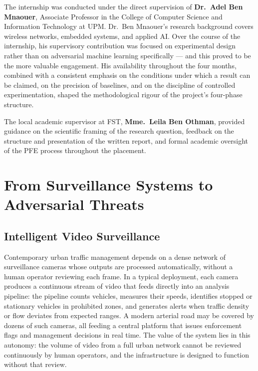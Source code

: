 \documentclass[12pt,a4paper]{report}
\begin{document}
The internship was conducted under the direct supervision of
\textbf{Dr.~Adel Ben Mnaouer}, Associate Professor in the
College of Computer Science and Information Technology at UPM.
Dr.~Ben Mnaouer's research background covers wireless networks,
embedded systems, and applied AI. Over the course of the
internship, his supervisory contribution was focused on
experimental design rather than on adversarial machine learning
specifically --- and this proved to be the more valuable
engagement. His availability throughout the four months,
combined with a consistent emphasis on the conditions under
which a result can be claimed, on the precision of baselines,
and on the discipline of controlled experimentation, shaped
the methodological rigour of the project's four-phase
structure.

The local academic supervisor at FST,
\textbf{Mme.~Leila Ben Othman}, provided guidance on the
scientific framing of the research question, feedback on the
structure and presentation of the written report, and formal
academic oversight of the PFE process throughout the placement.

\section{From Surveillance Systems to Adversarial Threats}
\label{sec:threats}

\subsection{Intelligent Video Surveillance}
\label{sec:surveillance}

Contemporary urban traffic management depends on a dense network
of surveillance cameras whose outputs are processed automatically,
without a human operator reviewing each frame. In a typical
deployment, each camera produces a continuous stream of video that
feeds directly into an analysis pipeline: the pipeline counts
vehicles, measures their speeds, identifies stopped or stationary
vehicles in prohibited zones, and generates alerts when traffic
density or flow deviates from expected ranges. A modern arterial
road may be covered by dozens of such cameras, all feeding a
central platform that issues enforcement flags and management
decisions in real time. The value of the system lies in this
autonomy: the volume of video from a full urban network cannot be
reviewed continuously by human operators, and the infrastructure
is designed to function without that review.
\end{document}
